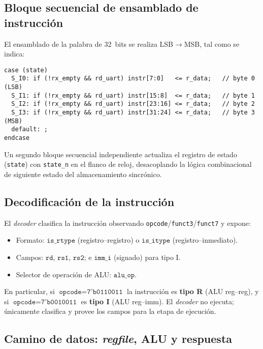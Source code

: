 \newpage

\subsection{Bloque secuencial de ensamblado de instrucción}

El ensamblado de la palabra de 32~bits se realiza LSB\(\rightarrow\)MSB, tal como se indica:

\begin{verbatim}
case (state)
  S_I0: if (!rx_empty && rd_uart) instr[7:0]   <= r_data;   // byte 0 (LSB)
  S_I1: if (!rx_empty && rd_uart) instr[15:8]  <= r_data;   // byte 1
  S_I2: if (!rx_empty && rd_uart) instr[23:16] <= r_data;   // byte 2
  S_I3: if (!rx_empty && rd_uart) instr[31:24] <= r_data;   // byte 3 (MSB)
  default: ;
endcase
\end{verbatim}

Un segundo bloque secuencial independiente actualiza el registro de estado (\texttt{state}) con \texttt{state\_n} en el flanco de reloj, desacoplando la lógica combinacional de siguiente estado del almacenamiento sincrónico.

\subsection{Decodificación de la instrucción}

El \textit{decoder} clasifica la instrucción observando \texttt{opcode}/\texttt{funct3}/\texttt{funct7} y expone:
\begin{itemize}
  \item Formato: \(\texttt{is\_rtype}\) (registro--registro) o \(\texttt{is\_itype}\) (registro--inmediato).
  \item Campos: \(\texttt{rd}\), \(\texttt{rs1}\), \(\texttt{rs2}\); e \(\texttt{imm\_i}\) (signado) para tipo I.
  \item Selector de operación de ALU: \(\texttt{alu\_op}\).
\end{itemize}
En particular, si \(\texttt{opcode} = \texttt{7'b0110011}\) la instrucción es \textbf{tipo R} (ALU reg--reg), y si \(\texttt{opcode} = \texttt{7'b0010011}\) es \textbf{tipo I} (ALU reg--imm). El \textit{decoder} no ejecuta; únicamente clasifica y provee los campos para la etapa de ejecución.

\subsection{Camino de datos: \textit{regfile}, ALU y respuesta}

